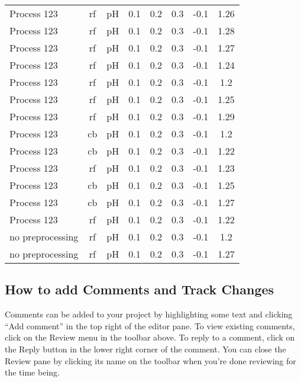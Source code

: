 \documentclass[a4paper,12pt,twoside]{article}
\begin{document}
\begin{ThreePartTable}
\begin{longtable}[c]{ l c c c c c c c }
		Process 123                & rf   & pH & 0.1 & 0.2 & 0.3 & -0.1 & 1.26 \\
		Process 123                & rf   & pH & 0.1 & 0.2 & 0.3 & -0.1 & 1.28 \\
		Process 123                & rf   & pH & 0.1 & 0.2 & 0.3 & -0.1 & 1.27 \\
		Process 123                & rf   & pH & 0.1 & 0.2 & 0.3 & -0.1 & 1.24 \\
		Process 123                & rf   & pH & 0.1 & 0.2 & 0.3 & -0.1 & 1.2  \\
		Process 123                & rf   & pH & 0.1 & 0.2 & 0.3 & -0.1 & 1.25 \\
		Process 123                & rf   & pH & 0.1 & 0.2 & 0.3 & -0.1 & 1.29 \\
		Process 123                & cb   & pH & 0.1 & 0.2 & 0.3 & -0.1 & 1.2  \\
		Process 123                & cb   & pH & 0.1 & 0.2 & 0.3 & -0.1 & 1.22 \\
		Process 123                & rf   & pH & 0.1 & 0.2 & 0.3 & -0.1 & 1.23 \\
		Process 123                & cb   & pH & 0.1 & 0.2 & 0.3 & -0.1 & 1.25 \\
		Process 123                & cb   & pH & 0.1 & 0.2 & 0.3 & -0.1 & 1.27 \\
		Process 123                & rf   & pH & 0.1 & 0.2 & 0.3 & -0.1 & 1.22 \\
		no preprocessing           & rf   & pH & 0.1 & 0.2 & 0.3 & -0.1 & 1.2  \\
		no preprocessing           & rf   & pH & 0.1 & 0.2 & 0.3 & -0.1 & 1.27 \\
	\end{longtable}
\end{ThreePartTable}



\subsection{How to add Comments and Track Changes}

Comments can be added to your project by highlighting some text and clicking ``Add comment'' in the top right of the editor pane. To view existing comments, click on the Review menu in the toolbar above. To reply to a comment, click on the Reply button in the lower right corner of the comment. You can close the Review pane by clicking its name on the toolbar when you're done reviewing for the time being.
\end{document}
